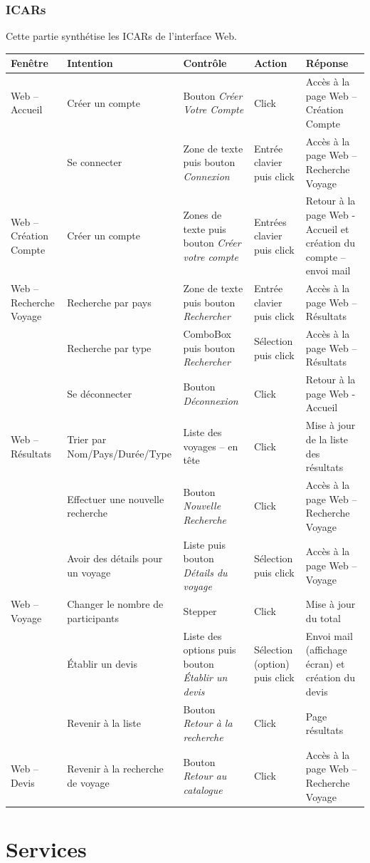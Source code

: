 \documentclass[11pt]{article}
\begin{document}
\subsubsection{ICARs}
Cette partie synthétise les ICARs de l'interface Web.
\begin{center}
\begin{footnotesize}
\begin{supertabular}{|p{2cm}|p{3cm}|p{3.5cm}|p{2cm}|p{4cm}|}
\hline 
\bf{Fenêtre} & \bf{Intention} & \bf{Contrôle} & \bf{Action} & \bf{Réponse} \\ \hline
Web – Accueil & Créer un compte & Bouton  \emph{Créer Votre Compte} & Click & Accès à la page Web – Création Compte \\ \hline
 & Se connecter & Zone de texte puis bouton  \emph{Connexion} & Entrée clavier puis click & Accès à la page Web – Recherche Voyage \\ \hline
Web – Création Compte & Créer un compte & Zones de texte puis bouton  \emph{Créer votre compte} & Entrées clavier puis click & Retour à la page Web -Accueil et création du compte – envoi mail \\ \hline
Web – Recherche Voyage & Recherche par pays & Zone de texte puis bouton  \emph{Rechercher} & Entrée clavier puis click & Accès à la page Web – Résultats \\ \hline
 & Recherche par type & ComboBox puis bouton  \emph{Rechercher} & Sélection puis click & Accès à la page Web – Résultats \\ \hline
 & Se déconnecter & Bouton  \emph{Déconnexion} & Click & Retour à la page Web -Accueil \\ \hline
Web – Résultats & Trier par Nom/Pays/Durée/Type & Liste des voyages – en tête & Click & Mise à jour de la liste des résultats \\ \hline
 & Effectuer une nouvelle recherche & Bouton  \emph{Nouvelle Recherche} & Click & Accès à la page Web – Recherche Voyage \\ \hline
 & Avoir des détails pour un voyage & Liste puis bouton \emph{Détails du voyage} & Sélection puis click & Accès à la page Web – Voyage \\ \hline
Web – Voyage & Changer le nombre de participants & Stepper & Click & Mise à jour du total \\ \hline
 & Établir un devis & Liste des options puis bouton  \emph{Établir un devis} & Sélection (option) puis click & Envoi mail (affichage écran) et création du devis \\ \hline
 & Revenir à la liste & Bouton  \emph{Retour à la recherche} & Click & Page résultats \\ \hline
Web – Devis &Revenir à la recherche de voyage & Bouton \emph{Retour au catalogue} & Click & Accès à la page Web – Recherche Voyage \\ \hline
\end{supertabular}
\end{footnotesize}
\end{center}

\section{Services}
\end{document}
